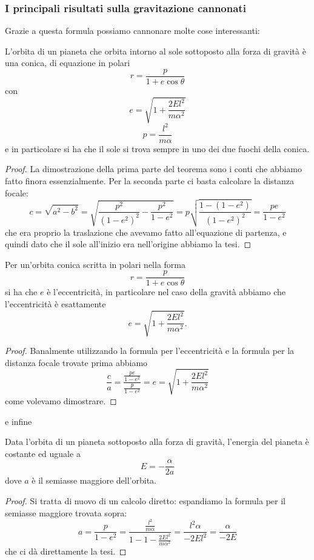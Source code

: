 \documentclass[11pt]{scrartcl}
\begin{document}
	\subsubsection{I principali risultati sulla gravitazione cannonati}
	Grazie a questa formula possiamo cannonare molte cose interessanti:
	\begin{theorem}
		L'orbita di un pianeta che orbita intorno al sole sottoposto alla forza di gravità è una conica, di equazione in polari
		$$r=\frac{p}{1+e\cos\theta}$$
		con 
		$$e=\sqrt{1+\frac{2El^2}{m\alpha^2}}$$
		$$p=\frac{l^2}{m\alpha}$$
		e in particolare si ha che il sole si trova sempre in uno dei due fuochi della conica.
	\end{theorem}
	\begin{proof}
		La dimostrazione della prima parte del teorema sono i conti che abbiamo fatto finora essenzialmente. Per la seconda parte ci basta calcolare la distanza focale:
		$$c=\sqrt{a^2-b^2}=\sqrt{\frac{p^2}{\left(1-e^2\right)^2}-\frac{p^2}{1-e^2}}=p\sqrt{\frac{1-(1-e^2)}{\left(1-e^2\right)^2}}=\frac{pe}{1-e^2}$$
		che era proprio la traslazione che avevamo fatto all'equazione di partenza, e quindi dato che il sole all'inizio era nell'origine abbiamo la tesi.
	\end{proof}
	\begin{lemma}
		Per un'orbita conica scritta in polari nella forma
		$$r=\frac{p}{1+e\cos\theta}$$
		si ha che $e$ è l'eccentricità, in particolare nel caso della gravità abbiamo che l'eccentricità è esattamente
		$$e=\sqrt{1+\frac{2El^2}{m\alpha^2}}.$$
	\end{lemma}
	\begin{proof}
		Banalmente utilizzando la formula per l'eccentricità e la formula per la distanza focale trovate prima abbiamo
		$$\frac{c}{a}=\frac{\frac{pe}{1-e^2}}{\frac{p}{1-e^2}}=e=\sqrt{1+\frac{2El^2}{m\alpha^2}}$$
		come volevamo dimostrare.
	\end{proof}
	e infine
	\begin{theorem}
		Data l'orbita di un pianeta sottoposto alla forza di gravità, l'energia del pianeta è costante ed uguale a 
		$$E=-\frac{\alpha}{2a}$$
		dove $a$ è il semiasse maggiore dell'orbita.
	\end{theorem}
	\begin{proof}
		Si tratta di nuovo di un calcolo diretto: espandiamo la formula per il semiasse maggiore trovata sopra:
		$$a=\frac{p}{1-e^2}=\frac{\frac{l^2}{m\alpha}}{1-1-\frac{2El^2}{m\alpha^2}}=\frac{l^2\alpha}{-2El^2}=\frac{\alpha}{-2E}$$
		che ci dà direttamente la tesi.
	\end{proof}
\end{document}

